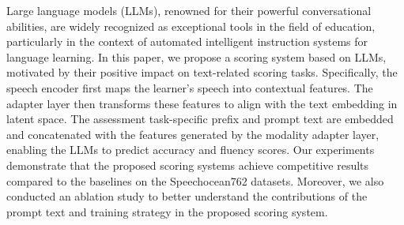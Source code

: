 Large language models (LLMs), renowned for their powerful conversational abilities, are widely recognized as exceptional tools in the field of education, particularly in the context of automated intelligent instruction systems for language learning. In this paper, we propose a scoring system based on LLMs, motivated by their positive impact on text-related scoring tasks. Specifically, the speech encoder first maps the learner’s speech into contextual features. The adapter layer then transforms these features to align with the text embedding in latent space. The assessment task-specific prefix and prompt text are embedded and concatenated with the features generated by the modality adapter layer, enabling the LLMs to predict accuracy and fluency scores. Our experiments demonstrate that the proposed scoring systems achieve competitive results compared to the baselines on the Speechocean762 datasets. Moreover, we also conducted an ablation study to better understand the contributions of the prompt text and training strategy in the proposed scoring system.



